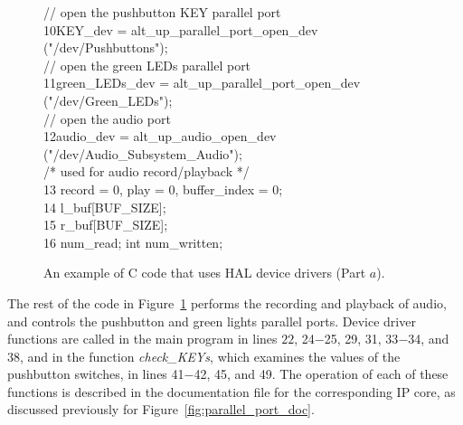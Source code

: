 \documentclass[11pt, twoside, pdftex]{article}
\begin{document}
\begin{figure}[h!]
\begin{center}
\begin{minipage}[t]{12.5 cm}
\begin{tabbing}
\>\>// open the pushbutton KEY parallel port\\
10\>\>KEY\_dev = alt\_up\_parallel\_port\_open\_dev ("/dev/Pushbuttons");\\
\>\>// open the green LEDs parallel port\\
11\>\>green\_LEDs\_dev = alt\_up\_parallel\_port\_open\_dev ("/dev/Green\_LEDs");\\
\>\>// open the audio port\\
12\>\>audio\_dev = alt\_up\_audio\_open\_dev ("/dev/Audio\_Subsystem\_Audio");\\
 
\>\>/* used for audio record/playback */\\
13\> record = 0, play = 0, buffer\_index = 0;\\
14\> l\_buf[BUF\_SIZE];\\
15\> r\_buf[BUF\_SIZE];\\
16\> num\_read; int num\_written;\\
\end{tabbing}
\end{minipage}
\end{center}
	\vspace{-0.33in}\caption{An example of C code that uses HAL device drivers (Part $a$).}
   \label{fig:HAL_audio}
\end{figure}
\clearpage

The rest of the code in Figure~\ref{fig:HAL_audio} performs the recording and playback of audio, and controls
the pushbutton and green lights parallel ports. Device driver functions are called in the main program in 
lines $22$, 24$-$25, 29, 31, 33$-$34, and 38, and in the function {\it check\_KEYs}, which examines
the values of the pushbutton switches, in lines 41$-$42, 45, and 49. The operation of each of these functions is 
described in the documentation file for the corresponding IP core, as discussed previously for 
Figure~\ref{fig:parallel_port_doc}.
\end{document}
